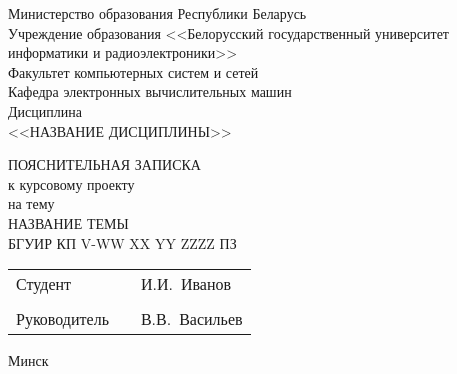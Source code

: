 \thispagestyle{empty}

\begin{center}
    Министерство образования Республики Беларусь\\[1em]
    Учреждение образования <<Белорусский государственный университет информатики и радиоэлектроники>>\\[2em]

    Факультет компьютерных систем и сетей\\[1em]
    Кафедра электронных вычислительных машин\\[1em]
    Дисциплина\\
    <<НАЗВАНИЕ ДИСЦИПЛИНЫ>>

    \vfill
    
    ПОЯСНИТЕЛЬНАЯ ЗАПИСКА\\
    к курсовому проекту\\
    на тему\\[1em]
    \MakeUppercase{НАЗВАНИЕ ТЕМЫ}\\[1em]
    БГУИР КП V-WW XX YY ZZZZ ПЗ\\

    \vfill
    
    \begin{flushleft}
    \begin{tabular}{@{}p{}p{}p{}}
        Студент                         &&   И.И.~Иванов      \\
                                        &&                    \\
        Руководитель                    &&   В.В.~Васильев    \\
    \end{tabular}
    \end{flushleft}
    
    \vfill
    {\normalsize Минск \the\year}
\end{center}

\newpage